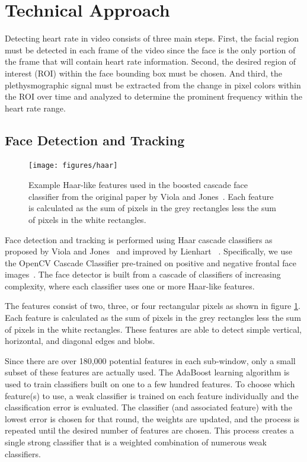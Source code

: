 \documentclass[10pt,twocolumn,letterpaper]{article}
\begin{document}
\section{Technical Approach} \label{tech_approach}

Detecting heart rate in video consists of three main steps. First, the facial region must be detected in each frame of the video since the face is the only portion of the frame that will contain heart rate information. Second, the desired region of interest (ROI) within the face bounding box must be chosen. And third, the plethysmographic signal must be extracted from the change in pixel colors within the ROI over time and analyzed to determine the prominent frequency within the heart rate range.

\subsection{Face Detection and Tracking}

\begin{figure}
\begin{center}
	\texttt{[image: figures/haar]}
\end{center}
\caption{Example Haar-like features used in the boosted cascade face classifier from the original paper by Viola and Jones~\cite{Viola:2001aa}. Each feature is calculated as the sum of pixels in the grey rectangles less the sum of pixels in the white rectangles.}
\label{haar}
\end{figure}

Face detection and tracking is performed using Haar cascade classifiers as proposed by Viola and Jones~\cite{Viola:2001aa} and improved by Lienhart \etal~\cite{Leinhart:2002aa}. Specifically, we use the OpenCV Cascade Classifier pre-trained on positive and negative frontal face images~\cite{opencv_library}. The face detector is built from a cascade of classifiers of increasing complexity, where each classifier uses one or more Haar-like features.

The features consist of two, three, or four rectangular pixels as shown in figure \ref{haar}. Each feature is calculated as the sum of pixels in the grey rectangles less the sum of pixels in the white rectangles. These features are able to detect simple vertical, horizontal, and diagonal edges and blobs. 

Since there are over 180,000 potential features in each sub-window, only a small subset of these features are actually used. The AdaBoost learning algorithm is used to train classifiers built on one to a few hundred features. To choose which feature(s) to use, a weak classifier is trained on each feature individually and the classification error is evaluated. The classifier (and associated feature) with the lowest error is chosen for that round, the weights are updated, and the process is repeated until the desired number of features are chosen. This process creates a single strong classifier that is a weighted combination of numerous weak classifiers.
\end{document}
